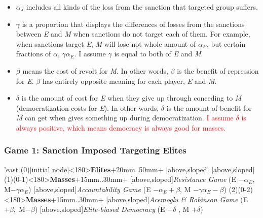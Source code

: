 \documentclass[11pt, letterpage]{article}
\begin{document}
\begin{itemize}
	\item $\alpha_J$ includes all kinds of the loss from the sanction that targeted group suffers.
	\item $\gamma$ is a proportion that displays the differences of losses from the sanctions between \textit{E} and \textit{M} when sanctions do not target each of them. For example, when sanctions target \textit{E}, \textit{M} will lose not whole amount of $\alpha_{E}$, but certain fractions of $\alpha$, $\gamma\alpha_{E}$. I assume $\gamma$ is equal to both of \textit{E} and \textit{M}.
	\item $\beta$ means the cost of revolt for \textit{M}. In other words, $\beta$ is the benefit of repression for \textit{E}. $\beta$ has entirely opposite meaning for each player, \textit{E} and \textit{M}.
	\item $\delta$ is the amount of cost for \textit{E} when they give up through conceding to \textit{M} (democratization costs for \textit{E}). In other words, $\delta$ is the amount of benefit for \textit{M} can get when  gives something up during democratization. \textcolor{red}{I assume $\delta$ is always positive, which means democracy is always good for masses.}
\end{itemize}
	
\subsubsection*{Game 1: Sanction Imposed Targeting Elites}
\begin{center}
\begin{istgame}[font=\footnotesize]
	\centering
	\setistgrowdirection'{east}
	\xtShowArrows
	\istroot(0)[initial node]<180>{\textbf{Elites}}+20mm..50mm+
	[above,sloped]  [above,sloped] \endist
	\istroot(1)(0-1)<180>{\textbf{Masses}}+15mm..30mm+
	[above,sloped]{\textit{Resistance Game} (E $- \alpha_{E}$, M$-\gamma$$\alpha_{E}$) }
	[above,sloped]{\textit{Accountability Game} (E $- \alpha_{E} + \beta$, M $- \gamma\alpha_{E} - \beta$)}  \endist
	\istroot(2)(0-2)<180>{\textbf{Masses}}+15mm..30mm+
	[above,sloped]{\textit{Acemoglu \& Robinson Game} (E $+ \beta,\; $M$-\beta$)}
	[above,sloped]{\textit{Elite-biased Democracy} (E $-\delta$ , M $+ \delta$)} \endist
\end{istgame}
\end{center}
	
\end{document}
